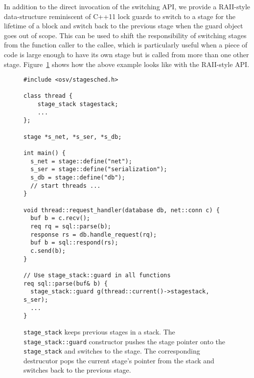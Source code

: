 \documentclass[12pt,a4paper]{book}
\begin{document}
In addition to the direct invocation of the switching API, we provide a RAII-style data-structure reminiscent of C++11 lock guards to switch to a stage for the lifetime of a block and switch back to the previous stage when the guard object goes out of scope.
This can be used to shift the responsibility of switching stages from the function caller to the callee, which is particularly useful when a piece of code is large enough to have its own stage but is called from more than one other stage.
Figure~\ref{fig:di:api:examplestack} shows how the above example looks like with the RAII-style API.

\begin{figure}[H]
\begin{lstlisting}[style=figurecpp,morekeywords={stage_stack,stage,stage::define,stage_stack::guard}]
#include <osv/stagesched.h>

class thread {
    stage_stack stagestack;
    ...
};

stage *s_net, *s_ser, *s_db;

int main() {
  s_net = stage::define("net");
  s_ser = stage::define("serialization");
  s_db = stage::define("db");
  // start threads ...
}

void thread::request_handler(database db, net::conn c) {
  buf b = c.recv();
  req rq = sql::parse(b);
  response rs = db.handle_request(rq);
  buf b = sql::respond(rs);
  c.send(b);
}

// Use stage_stack::guard in all functions
req sql::parse(buf& b) {
  stage_stack::guard g(thread::current()->stagestack, s_ser);
  ...
}

\end{lstlisting}
\caption{\lstinline[style=figurecpp]{stage_stack} keeps previous stages in a stack.
    The \lstinline[style=figurecpp]{stage_stack::guard} constructor pushes the stage pointer onto the \lstinline[style=figurecpp]{stage_stack} and switches to the stage.
    The corresponding destrucutor pops the current stage's pointer from the stack and switches back to the previous stage.}
\label{fig:di:api:examplestack}
\end{figure}
\end{document}
